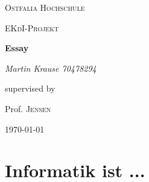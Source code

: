 \documentclass[12pt]{scrartcl}
\begin{document}
\begin{titlepage}
	\centering
	{\scshape\LARGE Ostfalia Hochschule \par}
	\vspace{1cm}
	{\scshape\Large EKdI-Projekt\par}
	\vspace{1.5cm}
	{\huge\bfseries Essay\par}
	\vspace{2cm}
	{\Large\itshape Martin Krause 70478294\par}
	\vfill
	supervised by\par
	Prof. \textsc{Jensen}

	\vfill

	{\large \today\par}
\end{titlepage}



\section{Informatik ist ...}
\end{document}
